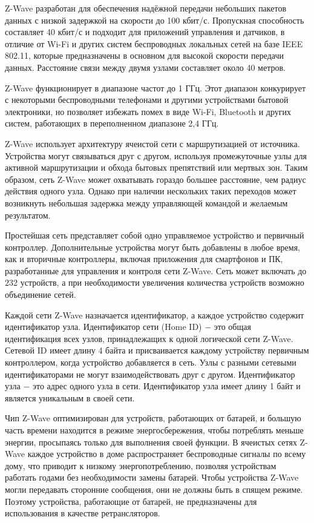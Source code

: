 	Z-Wave разработан для обеспечения надёжной передачи небольших пакетов данных с низкой задержкой 
	на скорости до 100 кбит/с. Пропускная способность составляет 40 кбит/с и подходит для приложений 
	управления и датчиков, в отличие от Wi-Fi и других систем беспроводных локальных сетей на базе IEEE 802.11, 
	которые предназначены в основном для высокой скорости передачи данных. Расстояние связи между 
	двумя узлами составляет около 40 метров.
	
	Z-Wave функционирует в диапазоне частот до 1 ГГц. Этот диапазон конкурирует с некоторыми беспроводными 
	телефонами и другими устройствами бытовой электроники, но позволяет избежать помех в виде Wi-Fi, Bluetooth 
	и других систем, работающих в переполненном диапазоне 2,4 ГГц.
	
	Z-Wave использует архитектуру ячеистой сети с маршрутизацией от источника. Устройства могут 
	связываться друг с другом, используя промежуточные узлы для активной маршрутизации и обхода 
	бытовых препятствий или мертвых зон. Таким образом, сеть Z-Wave может охватывать гораздо большее 
	расстояние, чем радиус действия одного узла. Однако при наличии нескольких таких переходов может 
	возникнуть небольшая задержка между управляющей командой и желаемым результатом.
	
	Простейшая сеть представляет собой одно управляемое устройство и первичный контроллер. Дополнительные 
	устройства могут быть добавлены в любое время, как и вторичные контроллеры, включая приложения 
	для смартфонов и ПК, разработанные для управления и контроля сети Z-Wave. Сеть может включать 
	до 232 устройств, а при необходимости увеличения количества устройств возможно объединение сетей.
	
	Каждой сети Z-Wave назначается идентификатор, а каждое устройство содержит идентификатор узла. 
	Идентификатор сети (Home ID) $-$ это общая идентификация всех узлов, принадлежащих к одной логической 
	сети Z-Wave. Сетевой ID имеет длину 4 байта и присваивается каждому устройству первичным контроллером, 
	когда устройство добавляется в сеть. Узлы с разными сетевыми идентификаторами не могут взаимодействовать 
	друг с другом. Идентификатор узла $-$ это адрес одного узла в сети. Идентификатор узла имеет 
	длину 1 байт и является уникальным в своей сети.
	
	Чип Z-Wave оптимизирован для устройств, работающих от батарей, и большую часть времени находится 
	в режиме энергосбережения, чтобы потреблять меньше энергии, просыпаясь только для выполнения своей 
	функции. В ячеистых сетях Z-Wave каждое устройство в доме распространяет беспроводные сигналы по 
	всему дому, что приводит к низкому энергопотреблению, позволяя устройствам работать годами без 
	необходимости замены батарей. Чтобы устройства Z-Wave могли передавать сторонние сообщения, 
	они не должны быть в спящем режиме. Поэтому устройства, работающие от батарей, не предназначены для 
	использования в качестве ретрансляторов.
	
